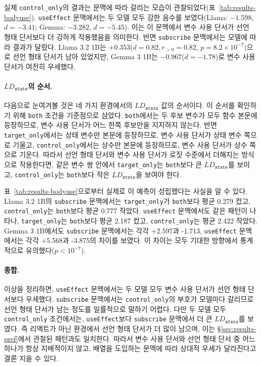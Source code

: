 \documentclass[11pt]{article}
\begin{document}
실제 \texttt{control\_only}의 결과는 문맥에 따라 갈리는 모습이 관찰되었다(표~\ref{tab:results-bodyuse}).
\texttt{useEffect} 문맥에서는 두 모델 모두 강한 음수를 보였다(Llama: $-1.598$, $d=-3.41$; Gemma: $-3.282$, $d=-5.45$).
이는 이 문맥에서 변수 사용 단서가 선언 형태 단서보다 더 강하게 작용했음을 의미한다.
반면 \texttt{subscribe} 문맥에서는 모델에 따라 결과가 달랐다.
Llama 3.2 1B는 $+0.353$($d=0.82, r_{>0}=0.82$, $p=8.2\times10^{-7}$)으로 선언 형태 단서가 남아 있었지만, Gemma 3 1B는 $-0.967$($d=-1.78$)로 변수 사용 단서가 여전히 우세했다.

\paragraph{$LD_\texttt{state}$의 순서.}
다음으로 눈여겨볼 것은 네 가지 환경에서의 $LD_\texttt{state}$ 값의 순서이다.
이 순서를 확인하기 위해 \texttt{both} 조건을 기준점으로 삼았다.
\texttt{both}에서는 두 후보 변수가 모두 함수 본문에 등장하므로, 변수 사용 단서가 어느 한쪽 후보만을 지지하지 않는다.
반면 \texttt{target\_only}에서는 상태 변수만 본문에 등장하므로, 변수 사용 단서가 상태 변수 쪽으로 기울고, \texttt{control\_only}에서는 상수만 본문에 등장하므로, 변수 사용 단서가 상수 쪽으로 기운다.
따라서 선언 형태 단서와 변수 사용 단서가 로짓 수준에서 더해지는 방식으로 작용한다면, 같은 변수 쌍 안에서 \texttt{target\_only}는 \texttt{both}보다 큰 $LD_\texttt{state}$를 보이고, \texttt{control\_only}는 \texttt{both}보다 작은 $LD_\texttt{state}$을 보여야 한다.

표~\ref{tab:results-bodyuse}으로부터 실제로 이 예측이 성립했다는 사실을 알 수 있다.
Llama 3.2 1B의 \texttt{subscribe} 문맥에서는 \texttt{target\_only}가 \texttt{both}보다 평균 0.279 컸고, \texttt{control\_only}는 \texttt{both}보다 평균 0.777 작았다.
\texttt{useEffect} 문맥에서도 같은 패턴이 나타나, \texttt{target\_only}는 \texttt{both}보다 평균 2.187 컸고, \texttt{control\_only}는 평균 2.422 작았다.
Gemma 3 1B에서도 \texttt{subscribe} 문맥에서는 각각 +2.597과 -1.713, \texttt{useEffect} 문맥에서는 각각 +5.568과 -3.875의 차이를 보였다.
이 차이는 모두 기대한 방향에서 통계적으로 유의했다($p<10^{-7}$).

\paragraph{종합.}
이상을 정리하면, \texttt{useEffect} 문맥에서는 두 모델 모두 변수 사용 단서가 선언 형태 단서보다 우세했다.
\texttt{subscribe} 문맥에서는 \texttt{control\_only}의 부호가 모델마다 갈리므로 선언 형태 단서가 남는 정도를 일률적으로 말하기 어렵다.
다만 두 모델 모두 \texttt{control\_only} 조건에서는, \texttt{useEffect}보다 \texttt{subscribe} 문맥에서 더 큰 $LD_\texttt{state}$를 보였다.
즉 리액트가 아닌 환경에서 선언 형태 단서가 더 많이 남으며, 이는 \S\ref{sec:results-pref}에서 관찰된 패턴과도 일치한다.
따라서 변수 사용 단서와 선언 형태 단서 중 어느 하나가 항상 지배적이지 않고, 배열을 도입하는 문맥에 따라 상대적 우세가 달라진다고 결론 지을 수 있다.
\end{document}
